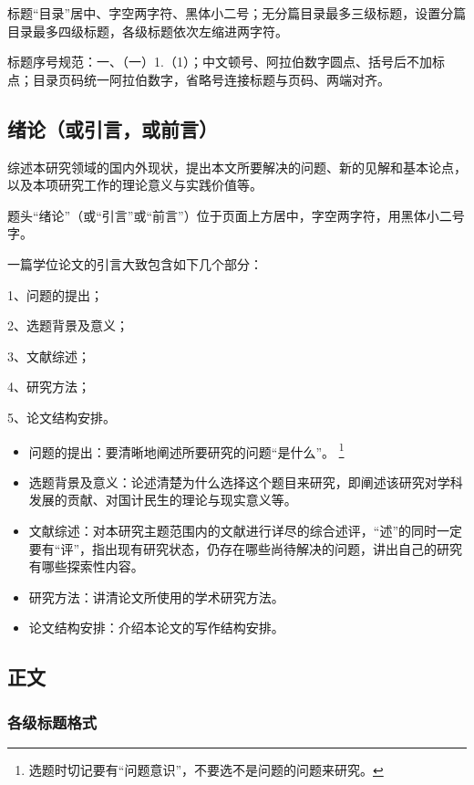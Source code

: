 标题“目录”居中、字空两字符、黑体小二号；无分篇目录最多三级标题，设置分篇目录最多四级标题，各级标题依次左缩进两字符。

标题序号规范：一、（一）1.（1）；中文顿号、阿拉伯数字圆点、括号后不加标点；目录页码统一阿拉伯数字，省略号连接标题与页码、两端对齐。

\subsection{绪论（或引言，或前言）}

综述本研究领域的国内外现状，提出本文所要解决的问题、新的见解和基本论点，以及本项研究工作的理论意义与实践价值等。

题头“绪论”（或“引言”或“前言”）位于页面上方居中，字空两字符，用黑体小二号字。

一篇学位论文的引言大致包含如下几个部分：

1、问题的提出；

2、选题背景及意义；

3、文献综述；

4、研究方法；

5、论文结构安排。

\begin{itemize}
	\item 问题的提出：要清晰地阐述所要研究的问题“是什么”。
	\footnote{选题时切记要有“问题意识”，不要选不是问题的问题来研究。}
	\item 选题背景及意义：论述清楚为什么选择这个题目来研究，即阐述该研究对学科发展的贡献、对国计民生的理论与现实意义等。
	\item 文献综述：对本研究主题范围内的文献进行详尽的综合述评，“述”的同时一定要有“评”，指出现有研究状态，仍存在哪些尚待解决的问题，讲出自己的研究有哪些探索性内容。
	\item 研究方法：讲清论文所使用的学术研究方法。
	\item 论文结构安排：介绍本论文的写作结构安排。
\end{itemize}

\subsection{正文}

\subsubsection{各级标题格式}

